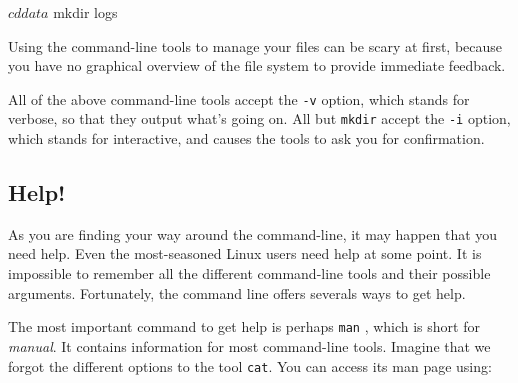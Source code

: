 \documentclass[
]{book}
\newenvironment{Shaded}{\begin{snugshade}}{\end{snugshade}}
\newcommand{\BuiltInTok}[1]{#1}
\newcommand{\ExtensionTok}[1]{#1}
\newcommand{\FunctionTok}[1]{\textcolor[rgb]{0.00,0.00,0.00}{#1}}
\newcommand{\KeywordTok}[1]{\textcolor[rgb]{0.13,0.29,0.53}{\textbf{#1}}}
\newcommand{\NormalTok}[1]{#1}
\theoremstyle{definition}
\theoremstyle{definition}
\theoremstyle{definition}
\theoremstyle{remark}
\begin{document}
\begin{Shaded}
\begin{Highlighting}[]
\NormalTok{$ }\BuiltInTok{cd}\NormalTok{ data}
\NormalTok{$ }\FunctionTok{mkdir}\NormalTok{ logs}
\end{Highlighting}
\end{Shaded}

Using the command-line tools to manage your files can be scary at first, because you have no graphical overview of the file system to provide immediate feedback.

All of the above command-line tools accept the \texttt{-v} option, which stands for verbose, so that they output what's going on. All but \texttt{mkdir} accept the \texttt{-i} option, which stands for interactive, and causes the tools to ask you for confirmation.

\hypertarget{help}{%
\subsection{Help!}\label{help}}

As you are finding your way around the command-line, it may happen that you need help. Even the most-seasoned Linux users need help at some point. It is impossible to remember all the different command-line tools and their possible arguments. Fortunately, the command line offers severals ways to get help.

The most important command to get help is perhaps \texttt{man} \citep{man}, which is short for \emph{manual}. It contains information for most command-line tools. Imagine that we forgot the different options to the tool \texttt{cat}. You can access its man page using:

\begin{Shaded}
\end{Shaded}
\end{document}
